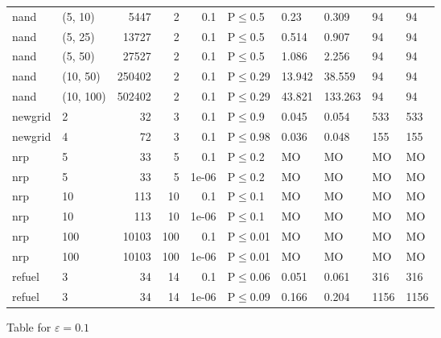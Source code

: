 \begin{longtable}{llrrrlllll}
 nand          & (5, 10)   &   	5447 &   2 & 0.1   & P$\leq$0.5   & 0.23    & 0.309   & 94     & 94     \\
 nand          & (5, 25)   &  	13727 &   2 & 0.1   & P$\leq$0.5   & 0.514   & 0.907   & 94     & 94     \\
 nand          & (5, 50)   &  	27527 &   2 & 0.1   & P$\leq$0.5   & 1.086   & 2.256   & 94     & 94     \\
 nand          & (10, 50)  & 	250402 &   2 & 0.1   & P$\leq$0.29  & 13.942  & 38.559  & 94     & 94     \\
 nand          & (10, 100) & 	502402 &   2 & 0.1   & P$\leq$0.29  & 43.821  & 133.263 & 94     & 94     \\
 newgrid       & 2         &     	32 &   3 & 0.1   & P$\leq$0.9   & 0.045   & 0.054   & 533    & 533    \\
 newgrid       & 4         &     	72 &   3 & 0.1   & P$\leq$0.98  & 0.036   & 0.048   & 155    & 155    \\
 nrp           & 5         &     	33 &   5 & 0.1   & P$\leq$0.2   & MO      & MO      & MO     & MO     \\
 nrp           & 5         &     	33 &   5 & 1e-06 & P$\leq$0.2   & MO      & MO      & MO     & MO     \\
 nrp           & 10        &    	113 &  10 & 0.1   & P$\leq$0.1   & MO      & MO      & MO     & MO     \\
 nrp           & 10        &    	113 &  10 & 1e-06 & P$\leq$0.1   & MO      & MO      & MO     & MO     \\
 nrp           & 100       &  	10103 & 100 & 0.1   & P$\leq$0.01  & MO      & MO      & MO     & MO     \\
 nrp           & 100       &  	10103 & 100 & 1e-06 & P$\leq$0.01  & MO      & MO      & MO     & MO     \\
 refuel        & 3         &     	34 &  14 & 0.1   & P$\leq$0.06  & 0.051   & 0.061   & 316    & 316    \\
 refuel        & 3         &     	34 &  14 & 1e-06 & P$\leq$0.09  & 0.166   & 0.204   & 1156   & 1156   \\
\bottomrule
\end{longtable}
\small Table for \(\varepsilon=0.1\)
